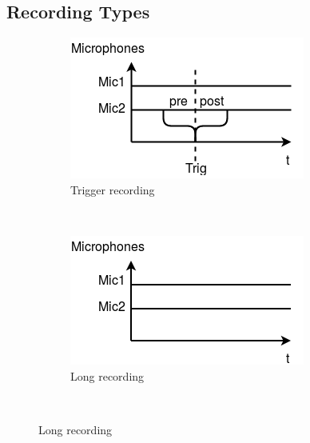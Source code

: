 \subsection{Recording Types} \label{sec:usecase:recordingtypes}
\begin{figure}[H]
    \centering
    \begin{subfigure}[b]{0.3\textwidth}
        \includegraphics[width=\textwidth]{figures/recording_trigger.png}
        \caption{Trigger recording}
        \label{fig:usecase:triggerrecording}
    \end{subfigure}
    ~ %
    \begin{subfigure}[b]{0.3\textwidth}
        \includegraphics[width=\textwidth]{figures/recording_long.png}
        \caption{Long recording}
        \label{fig:usecase:longrecording}
    \end{subfigure}
    ~ %

\end{figure}
